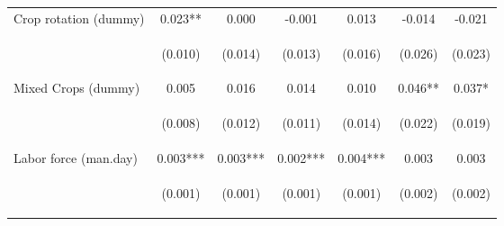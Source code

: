 \begin{center}
\begin{tabular}{lcccccc}
Crop rotation (dummy) & 0.023** & 0.000 & -0.001 & 0.013 & -0.014 & -0.021 \\
\vspace{4pt} & \begin{footnotesize}(0.010)\end{footnotesize} & \begin{footnotesize}(0.014)\end{footnotesize} & \begin{footnotesize}(0.013)\end{footnotesize} & \begin{footnotesize}(0.016)\end{footnotesize} & \begin{footnotesize}(0.026)\end{footnotesize} & \begin{footnotesize}(0.023)\end{footnotesize} \\
Mixed Crops (dummy) & 0.005 & 0.016 & 0.014 & 0.010 & 0.046** & 0.037* \\
\vspace{4pt} & \begin{footnotesize}(0.008)\end{footnotesize} & \begin{footnotesize}(0.012)\end{footnotesize} & \begin{footnotesize}(0.011)\end{footnotesize} & \begin{footnotesize}(0.014)\end{footnotesize} & \begin{footnotesize}(0.022)\end{footnotesize} & \begin{footnotesize}(0.019)\end{footnotesize} \\
Labor force (man.day) & 0.003*** & 0.003*** & 0.002*** & 0.004*** & 0.003 & 0.003 \\
\vspace{4pt} & \begin{footnotesize}(0.001)\end{footnotesize} & \begin{footnotesize}(0.001)\end{footnotesize} & \begin{footnotesize}(0.001)\end{footnotesize} & \begin{footnotesize}(0.001)\end{footnotesize} & \begin{footnotesize}(0.002)\end{footnotesize} & \begin{footnotesize}(0.002)\end{footnotesize} \\

\end{tabular}
\end{center}

